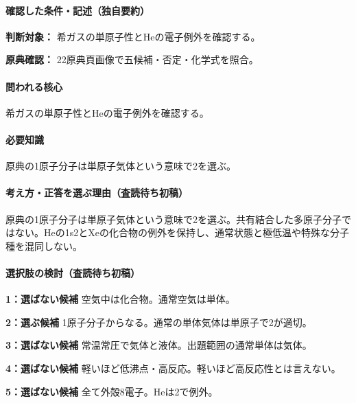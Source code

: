 \paragraph{確認した条件・記述（独自要約）}\mbox{}\par

\noindent\textbf{判断対象：} 希ガスの単原子性とHeの電子例外を確認する。\par

\noindent\textbf{原典確認：} 22原典頁画像で五候補・否定・化学式を照合。\par

\paragraph{問われる核心} 希ガスの単原子性とHeの電子例外を確認する。

\paragraph{必要知識} 原典の1原子分子は単原子気体という意味で2を選ぶ。

\paragraph{考え方・正答を選ぶ理由（査読待ち初稿）} 原典の1原子分子は単原子気体という意味で2を選ぶ。共有結合した多原子分子ではない。Heの1s2とXeの化合物の例外を保持し、通常状態と極低温や特殊な分子種を混同しない。

\paragraph{選択肢の検討（査読待ち初稿）}\mbox{}\par

\noindent\textbf{1：選ばない候補} 空気中は化合物。通常空気は単体。\par

\noindent\textbf{2：選ぶ候補} 1原子分子からなる。通常の単体気体は単原子で2が適切。\par

\noindent\textbf{3：選ばない候補} 常温常圧で気体と液体。出題範囲の通常単体は気体。\par

\noindent\textbf{4：選ばない候補} 軽いほど低沸点・高反応。軽いほど高反応性とは言えない。\par

\noindent\textbf{5：選ばない候補} 全て外殻8電子。Heは2で例外。\par

